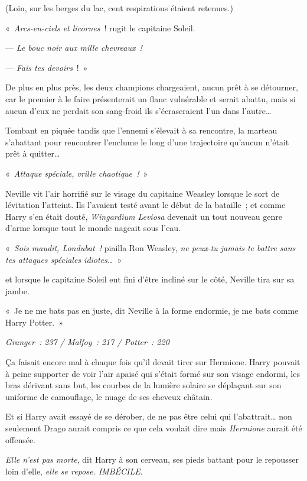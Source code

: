 (Loin, sur les berges du lac, cent respirations étaient retenues.)

«~\emph{Arcs-en-ciels et licornes}~! rugit le capitaine Soleil.

--- \emph{Le bouc noir aux mille chevreaux~!}

--- \emph{Fais tes devoirs}~!~»

De plus en plus près, les deux champions chargeaient, aucun prêt à se détourner, car le premier à le faire présenterait un flanc vulnérable et serait abattu, mais si aucun d'eux ne perdait son sang-froid ils s'écraseraient l'un dans l'autre…

Tombant en piquée tandis que l'ennemi s'élevait à sa rencontre, la marteau s'abattant pour rencontrer l'enclume le long d'une trajectoire qu'aucun n'était prêt à quitter…

«~\emph{Attaque spéciale, vrille chaotique~!}~»

Neville vit l'air horrifié sur le visage du capitaine Weasley lorsque le sort de lévitation l'atteint. Ils l'avaient testé avant le début de la bataille~; et comme Harry s'en était douté, \emph{Wingardium Leviosa} devenait un tout nouveau genre d'arme lorsque tout le monde nageait sous l'eau.

«~\emph{Sois maudit, Londubat~!} piailla Ron Weasley, \emph{ne peux-tu jamais te battre sans tes attaques spéciales idiotes…}~»

et lorsque le capitaine Soleil eut fini d'être incliné sur le côté, Neville tira sur sa jambe.

«~Je ne me bats pas en juste, dit Neville à la forme endormie, je me bats comme Harry Potter.~»

\emph{Granger~: 237 / Malfoy~: 217 / Potter~: 220}

\later

Ça faisait encore mal à chaque fois qu'il devait tirer sur Hermione. Harry pouvait à peine supporter de voir l'air apaisé qui s'était formé sur son visage endormi, les bras dérivant sans but, les courbes de la lumière solaire se déplaçant sur son uniforme de camouflage, le nuage de ses cheveux châtain.

Et si Harry avait essayé de se dérober, de ne pas être celui qui l'abattrait… non seulement Drago aurait compris ce que cela voulait dire mais \emph{Hermione} aurait été offensée.

\emph{Elle n'est pas morte}, dit Harry à son cerveau, ses pieds battant pour le repousser loin d'elle, \emph{elle se repose. IMBÉCILE}.

